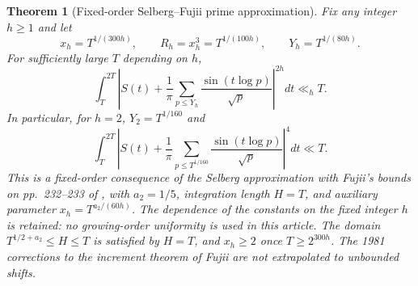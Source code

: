 \documentclass[11pt,reqno]{amsart}
\numberwithin{equation}{section}
\newtheorem{theorem}{Theorem}[section]
\begin{document}
\begin{theorem}[Fixed-order Selberg--Fujii prime approximation]
\label{thm:selberginput}
Fix any integer $h\ge1$ and let
\begin{equation}\label{eq:fujiiorder}
 x_h=T^{1/(300h)},\qquad R_h=x_h^3=T^{1/(100h)},
 \qquad Y_h=T^{1/(80h)}.
\end{equation}
For sufficiently large $T$ depending on $h$,
\begin{equation}\label{eq:selbergfixedorder}
\int_T^{2T}\left|S(t)+\frac1\pi\sum_{p\le Y_h}
\frac{\sin(t\log p)}{\sqrt p}\right|^{2h}dt\ll_h T.
\end{equation}
In particular, for $h=2$, $Y_2=T^{1/160}$ and
\begin{equation}\label{eq:selberginput}
\int_T^{2T}\left|S(t)+\frac1\pi\sum_{p\le T^{1/160}}
\frac{\sin(t\log p)}{\sqrt p}\right|^4dt\ll T.
\end{equation}
This is a fixed-order consequence of the Selberg approximation
with Fujii's bounds on pp.~232--233 of \cite{Fujii1974},
with $a_2=1/5$, integration length $H=T$, and
auxiliary parameter $x_h=T^{a_2/(60h)}$.
The dependence of the constants on the \emph{fixed} integer
$h$ is retained: no growing-order uniformity is used in
this article. The domain $T^{1/2+a_2}\le H\le T$
is satisfied by $H=T$, and $x_h\ge2$ once
$T\ge2^{300h}$. The 1981 corrections to the increment
theorem of Fujii are not extrapolated to unbounded shifts.
\end{theorem}
\end{document}
